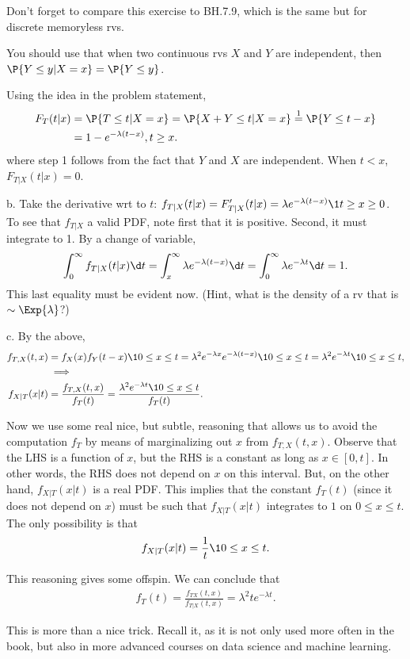 
\setcounter{theorem}{9}
\begin{exercise}[BH.7.10]
Don't forget to compare  this exercise to BH.7.9, which is the same but for discrete memoryless rvs.

You should use that when two continuous rvs $X$ and $Y$ are independent, then $\P{Y\leq y | X=x} = \P{Y\leq y}$.

\begin{solution}
Using the idea in the problem statement,
\begin{align*}
F_T(t|x) &= \P{T\leq t|X=x} = \P{X+Y\leq t|X=x} \stackrel{1}=\P{Y\leq t-x} \\
&=1 - e^{-\lambda(t-x)}, t \geq x.
\end{align*}
where step 1 follows from the fact that $Y$ and $X$ are independent. When $t<x$, $F_{T|X}(t|x) = 0$.

b. Take the derivative wrt to $t$: $f_{T|X} (t|x) = F_{T|X}'(t|x) = \lambda e^{-\lambda (t-x)}\1{t\geq x\geq 0}$. To see that $f_{T|X}$ a valid PDF, note first that it is positive. Second, it must integrate to 1. By a change of variable,
\begin{align*}
\int_0^{\infty}  f_{T|X} (t|x) \d t = \int_x^{\infty} \lambda e^{-\lambda (t-x)} \d t = \int_{0}^{\infty} \lambda e^{-\lambda t} \d t = 1.
\end{align*}
This last equality must be evident now. (Hint, what is the density of a rv  that is $\sim \Exp{\lambda}$?)


c. By the above,
\begin{align*}
f_{T,X}(t,x)  &=  f_X(x)f_Y(t-x) \1{0\leq x \leq t} = \lambda^2 e^{-\lambda x} e^{-\lambda(t-x)} \1{0\leq x \leq t} = \lambda^2e^{-\lambda t} \1{0\leq x\leq t},\\
  &\implies  \\
  f_{X|T}(x|t) &= \frac{f_{T,X}(t,x)}{f_T(t)}  = \frac{\lambda^2e^{-\lambda t} \1{0\leq x\leq t}}{f_T(t)}.
\end{align*}

Now we use some real nice, but subtle, reasoning that allows us to avoid the computation $f_T$ by means of marginalizing out $x$ from $f_{T,X}(t, x)$.
Observe that the LHS is a function of $x$, but the RHS is a constant as long as $x\in [0, t]$.  In other words, the RHS does not depend on $x$ on this interval.
But, on the other hand,  $f_{X|T}(x|t)$ is  a real PDF.
This implies that the constant $f_T(t)$ (since it does not depend on $x$) must be such that $f_{X|T}(x|t)$ integrates to $1$ on $0\leq x \leq t$.
The only possibility is that
\begin{equation*}
f_{X|T}(x|t) = \frac{1}{t}\1{0\leq x \leq t}.
\end{equation*}

This reasoning gives some  offspin.  We can conclude that
\begin{align*}
  f_T(t) = \frac{f_{TX}(t, x)}{f_{T|X}(t,x)}= \lambda^2 t e^{-\lambda t}.
\end{align*}


This is more than a nice trick. Recall it, as it is not only used more often in the book, but also in more advanced courses on data science and machine learning.
\end{solution}
\end{exercise}
